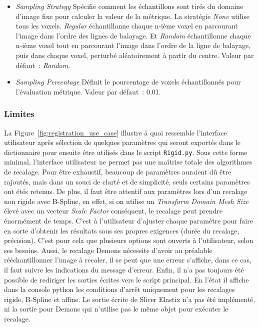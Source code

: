 \documentclass{article}
\begin{document}
{{        \begin{itemize}
            \item \textit{Sampling Strategy} Spécifie comment les échantillons sont tirés du domaine d'image fixe pour calculer la valeur de la métrique. La stratégie \textit{None} utilise tous les voxels. \textit{Regular} échantillonne chaque n-ième voxel en parcourant l'image dans l'ordre des lignes de balayage. Et \textit{Random} échantillonne chaque n-ième voxel tout en parcourant l'image dans l'ordre de la ligne de balayage, puis dans chaque voxel, perturbé aléatoirement à partir du centre. Valeur par défaut~: \textit{Random}.

            \item \textit{Sampling Percentage} Définit le pourcentage de voxels échantillonnés pour l'évaluation métrique. Valeur par défaut~: 0.01.
        \end{itemize}

        \subsubsection{Limites}
        \label{subsubsec:limits-registration-implementation}

        La Figure~\ref{fig:registration_use_case} illustre à quoi ressemble l'interface utilisateur après sélection de quelques paramètres qui seront exportés dans le dictionnaire pour ensuite être utilisés dans le script \texttt{Rigid.py}. Sous cette forme minimal, l'interface utilisateur ne permet pas une maîtrise totale des algorithmes de recalage. Pour être exhaustif, beaucoup de paramètres auraient dû être rajoutés, mais dans un souci de clarté et de simplicité, seuls certains paramètres ont étés retenus. De plus, il faut être attentif aux paramètres lors d'un recalage non rigide avec B-Spline, en effet, si on utilise un \textit{Transform Domain Mesh Size} élevé avec un vecteur \textit{Scale Factor} conséquent, le recalage peut prendre énormément de temps. C'est à l'utilisateur d'ajuster chaque paramètre pour faire en sorte d'obtenir les résultats sous ses propres exigences (durée du recalage, précision). C'est pour cela que plusieurs options sont ouverts à l'utilisateur, selon ses besoins. Aussi, le recalage Demons nécessite d'avoir au préalable rééchantillonner l'image à recaler, il se peut que une erreur s'affiche, dans ce cas, il faut suivre les indications du message d'erreur. Enfin, il n'a pas toujours été possible de rediriger les sorties écrites vers le script principal. En l'état il affiche dans la console python les conditions d'arrêt uniquement pour les recalages rigide, B-Spline et affine. Le sortie écrite de Slicer Elastix n'a pas été implémenté, ni la sortie pour Demons qui n'utilise pas le même objet pour exécuter le recalage.

}}
\end{document}
